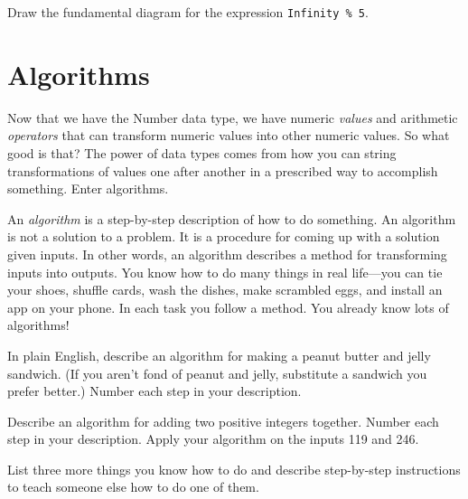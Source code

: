 \begin{question}
  Draw the fundamental diagram for the expression \texttt{Infinity \% 5}.
\end{question}


\section{Algorithms}

Now that we have the \textsf{Number} data type, we have numeric \emph{values} and arithmetic \emph{operators} that can transform numeric values into other numeric values. So what good is that? The power of data types comes from how you can string transformations of values one after another in a prescribed way to accomplish something. Enter algorithms.

An \emph{algorithm} is a step-by-step description of how to do something. An algorithm is not a solution to a problem. It is a procedure for coming up with a solution given inputs. In other words, an algorithm describes a method for transforming inputs into outputs. You know how to do many things in real life---you can tie your shoes, shuffle cards, wash the dishes, make scrambled eggs, and install an app on your phone. In each task you follow a method. You already know lots of algorithms!

\begin{question}
  In plain English, describe an algorithm for making a peanut butter and jelly sandwich. (If you aren't fond of peanut and jelly, substitute a sandwich you prefer better.) Number each step in your description.
\end{question}

\begin{question}
  Describe an algorithm for adding two positive integers together. Number each step in your description. Apply your algorithm on the inputs 119 and 246.
\end{question}

\begin{question}
  List three more things you know how to do and describe step-by-step instructions to teach someone else how to do one of them.
\end{question}

